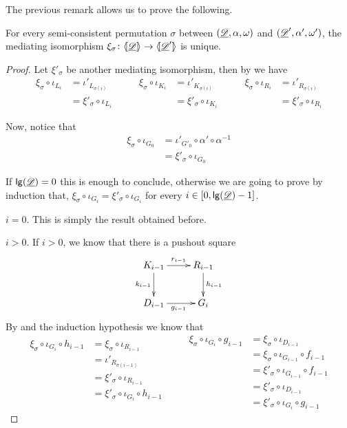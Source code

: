 The previous remark allows us to prove the following.

\begin{lemma}\label{prop:isouno} For every semi-consistent permutation $\sigma$ between  $(\underline{\mathscr{D}}, \alpha, \omega)$ and $(\underline{\mathscr{D}}', \alpha', \omega')$, the mediating isomorphism $\xi_\sigma\colon \langle \hspace{-1.85pt}[ \underline{\mathscr{D}}]\hspace{-1.85pt}\rangle\to \langle \hspace{-1.85pt}[ \underline{\mathscr{D}}']\hspace{-1.85pt}\rangle$ is unique.
\end{lemma}
\begin{proof} Let $\xi'_\sigma$ be another mediating isomorphism, then by  we have
	\[\begin{split}
		\xi_\sigma \circ \iota_{L_i}&=\iota'_{L_{\sigma(i)}}\\&=\xi'_\sigma\circ \iota_{L_i}
	\end{split} \qquad \begin{split}
		\xi_\sigma \circ \iota_{K_i}&=\iota'_{K_{\sigma(i)}}\\&=\xi'_\sigma\circ \iota_{K_i}
	\end{split} \qquad \begin{split}
		\xi_\sigma \circ \iota_{R_i}&=\iota'_{R_{\sigma(i)}}\\&=\xi'_\sigma\circ \iota_{R_i}
	\end{split}\]
	
	Now, notice that 
	\begin{align*}
		\xi_\sigma \circ \iota_{G_0}&=\iota'_{G'_0}\circ \alpha'\circ \alpha^{-1}\\&=\xi'_\sigma \circ \iota_{G_0}
	\end{align*}
	
	If $\mathsf{lg}(\underline{\mathscr{D}})=0$ this is enough to conclude, otherwise we are going to prove by induction that, $\xi_\sigma \circ \iota_{G_i}=\xi'_\sigma\circ \iota_{G_i}$ for every $i\in [0, \mathsf{lg}(\underline{\mathscr{D}})-1]$.
	
	\smallskip \noindent $i=0$. This is simply the result obtained before.
	
	\smallskip \noindent $i >0$. If $i>0$, we know that there is a pushout square
	\[\xymatrix{K_{i-1}\ar[r]^{r_{i-1}} \ar[d]_{k_{i-1}}& R_{i-1} \ar[d]^{h_{i-1}}\\ D_{i-1} \ar[r]_{g_{i-1}}& G_i}\] 
	By  and the induction hypothesis we know that
	\[\begin{split}
		\xi_\sigma \circ \iota_{G_i}\circ h_{i-1}&=  \xi_\sigma\circ \iota_{R_{i-1}}\\&=\iota'_{R_{\sigma(i-1)}}\\&=\xi'_{\sigma}\circ \iota_{R_{i-1}}\\&=\xi'_{\sigma} \circ \iota_{G_i}\circ h_{i-1}\\&
	\end{split} \qquad
	\begin{split}
		\xi_\sigma \circ \iota_{G_i}\circ g_{i-1}&=\xi_{\sigma}\circ \iota_{D_{i-1}}\\&=\xi_{\sigma}\circ \iota_{G_{i-1}} \circ f_{i-1}\\&=\xi'_{\sigma}\circ \iota_{G_{i-1}} \circ f_{i-1}\\&=\xi'_{\sigma}\circ \iota_{D_{i-1}} \\&=\xi'_{\sigma}\circ \iota_{G_{i}} \circ g_{i-1}
	\end{split}
	\]
	

\end{proof}

